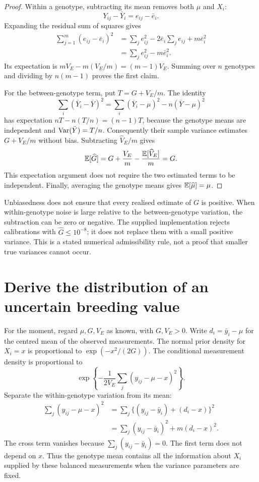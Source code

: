 \begin{proof}
Within a genotype, subtracting its mean removes both \(\mu\) and \(X_i\):
\[
 Y_{ij}-\bar Y_i=e_{ij}-\bar e_i.
\]
Expanding the residual sum of squares gives
\begin{align*}
 \sum_{j=1}^m(e_{ij}-\bar e_i)^2
 &=\sum_j e_{ij}^2-2\bar e_i\sum_j e_{ij}+m\bar e_i^2\\
 &=\sum_j e_{ij}^2-m\bar e_i^2.
\end{align*}
Its expectation is \(mV_E-m(V_E/m)=(m-1)V_E\). Summing over \(n\)
genotypes and dividing by \(n(m-1)\) proves the first claim.

For the between-genotype term, put \(T=G+V_E/m\). The identity
\[
 \sum_i(\bar Y_i-\bar Y)^2
 =\sum_i(\bar Y_i-\mu)^2-n(\bar Y-\mu)^2
\]
has expectation \(nT-n(T/n)=(n-1)T\), because the genotype means are
independent and \(\operatorname{Var}(\bar Y)=T/n\). Consequently their sample variance
estimates \(G+V_E/m\) without bias. Subtracting \(\widehat V_E/m\) gives
\[
 \mathbb E[\widehat G]
 =G+\frac{V_E}{m}-\frac{\mathbb E[\widehat V_E]}{m}=G.
\]
This expectation argument does not require the two estimated terms to be
independent. Finally, averaging the genotype means gives
\(\mathbb E[\widehat\mu]=\mu\).
\end{proof}

Unbiasedness does not ensure that every realised estimate of \(G\) is positive.
When within-genotype noise is large relative to the between-genotype variation,
the subtraction can be zero or negative. The supplied implementation rejects
calibrations with \(\widehat G\leq10^{-8}\); it does not replace them with a
small positive variance. This is a stated numerical admissibility rule,
not a proof that smaller true variances cannot occur.

\section{Derive the distribution of an uncertain breeding value}
\label{estimation:conditioning}

For the moment, regard \(\mu,G,V_E\) as known, with \(G,V_E>0\). Write
\(d_i=\bar y_i-\mu\) for the centred mean of the observed measurements.
The normal prior density for \(X_i=x\) is proportional to
\(\exp(-x^2/(2G))\). The conditional measurement density is proportional to
\[
 \exp\!\left\{-\frac{1}{2V_E}
 \sum_j(y_{ij}-\mu-x)^2\right\}.
\]
Separate the within-genotype variation from its mean:
\begin{align}
 \sum_j(y_{ij}-\mu-x)^2
 &=\sum_j\{(y_{ij}-\bar y_i)+(d_i-x)\}^2\nonumber\\
 &=\sum_j(y_{ij}-\bar y_i)^2+m(d_i-x)^2.
 \label{estimation:measurement_factorisation}
\end{align}
The cross term vanishes because
\(\sum_j(y_{ij}-\bar y_i)=0\). The first term does not depend on \(x\).
Thus the genotype mean contains all the information about \(X_i\) supplied
by these balanced measurements when the variance parameters are fixed.

